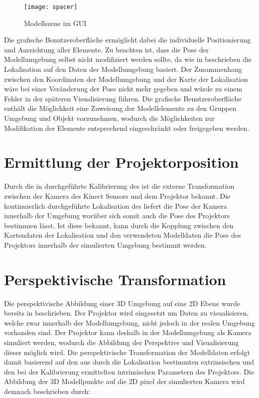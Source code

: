 \begin{figure}[!ht]
	\begin{center}
		\texttt{[image: spacer]}
		\caption{Modellszene im GUI}
		\label{fig.modscene}
	\end{center}
\end{figure}


Die grafische Benutzeroberfläche ermöglicht dabei die individuelle Positionierung und Ausrichtung aller Elemente. Zu beachten ist, dass die Pose der Modellumgebung selbst nicht modifiziert werden sollte, da wie in  beschrieben die Lokalisation auf den Daten der Modellumgebung basiert. Der Zusammenhang zwischen den Koordinaten der Modellumgebung und der Karte der Lokalisation wäre bei einer Veränderung der Pose nicht mehr gegeben und würde zu einem Fehler in der späteren Visualisierung führen. Die grafische Benutzeroberfläche enthält die Möglichkeit eine Zuweisung der Modellelemente zu den Gruppen Umgebung und Objekt vorzunehmen, wodurch die Möglichkeiten zur Modifikation der Elemente entsprechend eingeschränkt oder freigegeben werden.



\section{Ermittlung der Projektorposition}
Durch die in  durchgeführte Kalibrierung des  ist die externe Transformation zwischen der Kamera des Kinect Sensors und dem Projektor bekannt. Die kontinuierlich durchgeführte Lokalisation des  liefert die Pose der Kamera innerhalb der Umgebung worüber sich somit auch die Pose des Projektors bestimmen lässt. Ist diese bekannt, kann durch die Kopplung zwischen den Kartendaten der Lokalisation und den verwendeten Modelldaten die Pose des Projektors innerhalb der simulierten Umgebung bestimmt werden.

\section{Perspektivische Transformation}
Die perspektivische Abbildung einer 3D Umgebung auf eine 2D Ebene wurde bereits in  beschrieben. Der Projektor wird eingesetzt um Daten zu visualisieren, welche zwar innerhalb der Modellumgebung, nicht jedoch in der realen Umgebung vorhanden sind. Der Projektor kann deshalb in der Modellumgebung als Kamera simuliert werden, wodurch die Abbildung der Perspektive und Visualisierung dieser möglich wird. Die perspektivische Transformation der Modelldaten erfolgt damit basierend auf den aus durch die Lokalisation bestimmten extrinsischen und den bei der Kalibrierung ermittelten intrinsischen Parametern des Projektors. Die Abbildung der 3D Modellpunkte auf die 2D pixel der simulierten Kamera wird demnach beschrieben durch:

